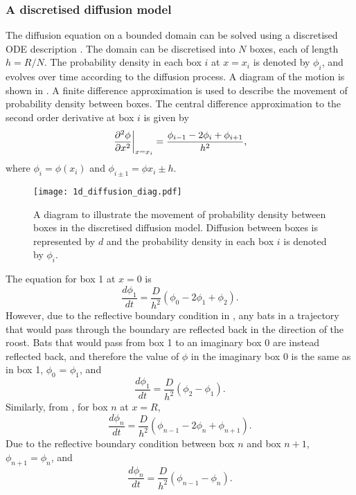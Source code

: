  \subsubsection{A discretised diffusion model} \label{1ddiscrete}

 The diffusion equation on a bounded domain can be solved using a discretised ODE description \cite{woolley2011stochastic}. The domain can be discretised into $N$ boxes, each of length
 $h=R/N$. The probability density in each box $i$ at $x=x_i$ is denoted by $\phi_i$, and evolves over time according to the diffusion process. A diagram of the motion is shown in . A finite difference approximation is used to describe the movement of probability density between boxes. The central difference approximation to the second order derivative at box $i$ is given by
 \begin{equation}
  \left.\frac{\partial^2 \phi}{\partial x^2}\right|_{x=x_i}= \frac{\phi_{i-1}-2\phi_i+\phi_{i+1}}{h^2}, \label{eqn:diffusion_discrete1di}
 \end{equation}
 where $\phi_i=\phi(x_i)$ and $\phi_{i \pm 1}=\phi{x_i \pm h}$.
%
 \begin{figure} [t]
     \centering
         \texttt{[image: 1d\_diffusion\_diag.pdf]}
         \caption{A diagram to illustrate the movement of probability density between boxes in the discretised diffusion model. Diffusion between boxes is represented by $d$ and the probability density in each box $i$ is denoted by $\phi_i$.}
     \label{fig:diffusion_diagram1d}
 \end{figure}
%

 The equation for box 1 at $x = 0$ is
 \begin{equation}
 \frac{d\phi_1}{dt} = \frac{D}{h^2}(\phi_{0}-2\phi_1 +\phi_{2}).
 \end{equation}
 However, due to the reflective boundary condition in , any bats in a trajectory that would pass through the boundary are reflected back in the direction of the roost. Bats that would pass from box 1 to an imaginary box 0 are instead reflected back, and therefore the value of $\phi$ in the imaginary box 0 is the same as in box 1, $\phi_0$ = $\phi_1$, and
 \begin{equation}
 \frac{d\phi_1}{dt} = \frac{D}{h^2}(\phi_{2}- \phi_1).
         \label{eqn:box_1}
 \end{equation}
%
 Similarly, from , for box $n$ at $x=R$,
 \begin{equation}
 \frac{d\phi_n}{dt} = \frac{D}{h^2}(\phi_{n-1}-2\phi_n +\phi_{n+1}).
 \end{equation}
 Due to the reflective boundary condition between box $n$ and box $n+1$, $\phi_{n+1} = \phi_n$, and
 \begin{equation}
 \frac{d\phi_n}{dt} = \frac{D}{h^2}(\phi_{n-1}-\phi_n).
         \label{eqn:annulus_n1d}
 \end{equation}

